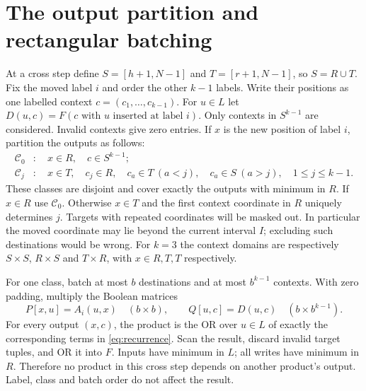 \documentclass[acmlarge,11pt,screen,nonacm]{acmart}
\begin{document}
\section{The output partition and rectangular batching}\label{sec:batching}
At a cross step define $S=[h+1,N-1]$ and $T=[r+1,N-1]$, so $S=R\cup T$.
Fix the moved label $i$ and order the other $k-1$ labels. Write their positions
as one labelled context $c=(c_1,\ldots,c_{k-1})$. For $u\in L$ let
$D(u,c)=F(c\text{ with }u\text{ inserted at label }i)$. Only contexts in
$S^{k-1}$ are considered. Invalid contexts give zero entries. If $x$ is the
new position of label $i$, partition the outputs as follows:
\begin{align}
 \mathcal C_0 &: \quad x\in R,\quad c\in S^{k-1};\label{eq:classes0}\\
 \mathcal C_j &: \quad x\in T,\quad c_j\in R,\quad
 c_a\in T\ (a<j),\quad c_a\in S\ (a>j),
 \quad 1\leq j\leq k-1.\label{eq:classesj}
\end{align}
These classes are disjoint and cover exactly the outputs with minimum in
$R$. If $x\in R$ use $\mathcal C_0$. Otherwise $x\in T$ and the first
context coordinate in $R$ uniquely determines $j$. Targets with repeated
coordinates will be masked out. In particular the moved coordinate may lie
beyond the current interval $I$; excluding such destinations would be wrong.
For $k=3$ the context domains are respectively $S\times S$, $R\times S$
and $T\times R$, with $x\in R,T,T$ respectively.

For one class, batch at most $b$ destinations and at most $b^{k-1}$ contexts.
With zero padding, multiply the Boolean matrices
\begin{equation}\label{eq:product}
 P[x,u]=A_i(u,x)\quad(b\times b),\qquad
 Q[u,c]=D(u,c)\quad(b\times b^{k-1}).
\end{equation}
For every output $(x,c)$, the product is the OR over $u\in L$ of exactly
the corresponding terms in \eqref{eq:recurrence}. Scan the result, discard
invalid target tuples, and OR it into $F$. Inputs have minimum in $L$;
all writes have minimum in $R$. Therefore no product in this cross step
depends on another product's output. Label, class and batch order do not
affect the result.
\end{document}
